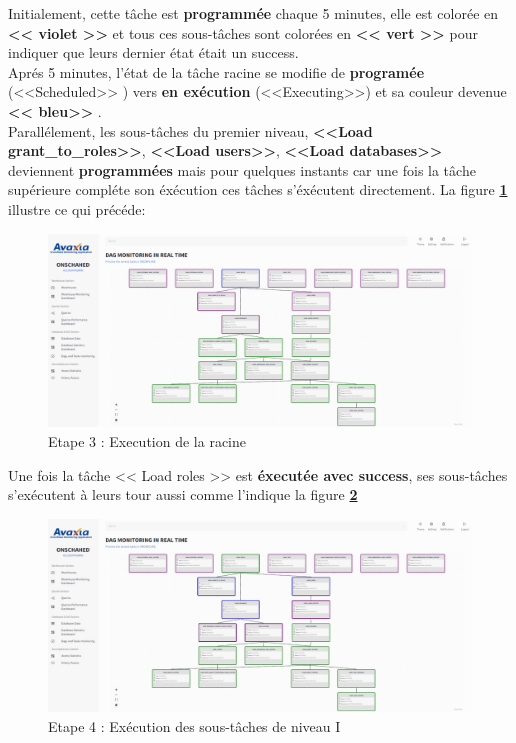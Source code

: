 Initialement, cette tâche est \textbf{programmée} chaque 5 minutes, elle est colorée en \textbf{<< violet >>} et tous ces sous-tâches sont colorées en \textbf{<< vert >>} pour indiquer que leurs dernier état était un success. \\
Aprés 5 minutes, l'état de la tâche racine se modifie de \textbf{programée} (<<Scheduled>> ) vers \textbf{en exécution} (<<Executing>>) et sa couleur devenue \textbf{<< bleu>> }. \\
Parallélement, les sous-tâches du premier niveau, \textbf{<<Load grant\_to\_roles>>}, \textbf{<<Load users>>}, \textbf{<<Load databases>>} deviennent \textbf{programmées} mais pour quelques instants car une fois la tâche supérieure compléte son éxécution ces tâches s'éxécutent directement.
La figure \textbf{\ref{fig:executing}} illustre ce qui précéde:
    \begin{figure}[H]
    \centering
    \includegraphics[width =1\linewidth]{img/captures/dag/final/1.png}
    \caption{Etape 3 : Execution de la racine}
    \label{fig:executing}
    \end{figure}
\par Une fois la tâche << Load roles >> est \textbf{éxecutée avec success}, ses sous-tâches s'exécutent à leurs tour aussi comme l'indique la figure \textbf{\ref{fig:success}}
\begin{figure}[H]
    \centering
    \includegraphics[width =1\linewidth]{img/captures/dag/final/2.jpg}
    \caption{Etape 4 : Exécution des sous-tâches de niveau I}
    \label{fig:success}
    \end{figure}

